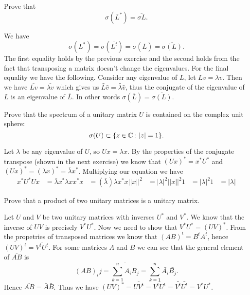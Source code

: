\documentclass{article}
\begin{document}
\begin{problem}
  Prove that
  \[\sigma (L^*) = \overline{\sigma{L}}.\]
\end{problem}

\begin{solution}
  We have
  \[\sigma(L^*) = \sigma(\overline{L^t}) = \sigma(\overline{L}) = \overline{\sigma(L)}.\]
  The first equality holds by the previous exercise and the second holds from the fact that transposing a matrix doesn't change the eigenvalues.
  For the final equality we have the following.
  Consider any eigenvalue of $L$, let $L v = \lambda v$.
  Then we have $\overline{L v} = \overline{\lambda v}$ which gives us $\bar{L} \bar{v} = \bar{\lambda} \bar{v}$, thus the conjugate of the eigenvalue of $L$ is an eigenvalue of $\overline{L}$.
  In other words $\sigma(\overline{L}) = \overline{\sigma(L)}$.
  \end{solution}

\begin{problem}
  Prove that the spectrum of a unitary matrix $U$ is contained on the complex unit sphere:
  \[\sigma(U) \subset \{z \in \mathbb{C} : |z| = 1\}.\]
\end{problem}

\begin{solution}
  Let $\lambda$ be any eigenvalue of $U$, so $U x = \lambda x$.
  By the properties of the conjugate transpose (shown in the next exercise) we know that $(U x)^* = x^* U^*$ and $(U x)^* = (\lambda x)^* = \overline{\lambda} x^*$.
  Multiplying our equation we have
  \[\begin{aligned}
    x^* U^* U x &= \overline{\lambda} x^* \lambda x
    x^* x &= (\overline{\lambda}) \lambda x^* x
    ||x||^2 &= |\lambda|^2 ||x||^2
    1 &= |\lambda|^2
    1 &= |\lambda|
  \end{aligned}\]
\end{solution}

\begin{problem}
  Prove that a product of two unitary matrices is a unitary matrix.
\end{problem}

\begin{solution}
  Let $U$ and $V$ be two unitary matrices with inverses $U^*$ and $V^*$.
  We know that the inverse of $UV$ is precisely $V^* U^*$.
  Now we need to show that $V^* U^* = (UV)^*$.
  From the propetries of transposed matrices we know that $(AB)^t = B^t A^t$, hence $\overline{(UV)^t} = \overline{V^t U^t}$.
  For some matrices $A$ and $B$ we can see that the general element of $\overline{AB}$ is
  \[\overline{(AB)_ij} = \overline{\sum_{k=1}^{n} A_i B_j} = \sum_{k=1}^{n} \bar{A_i} \bar{B_j}.\]
  Hence $\overline{AB} = \bar{A} \bar{B}$.
  Thus we have $(UV)^* = \overline{UV^t} = \overline{V^t U^t} = \bar{V^t} \bar{U^t} = V^* U^*$.
\end{solution}
\end{document}
